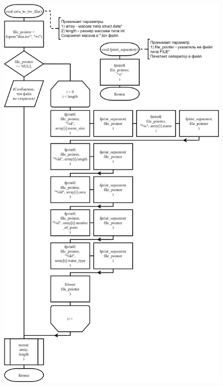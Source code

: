 \begin{figure}[!htp]
    \includegraphics[height=25cm]{../src/menu/save_to_tsv_file/save_to_tsv_file.png}
\end{figure}

